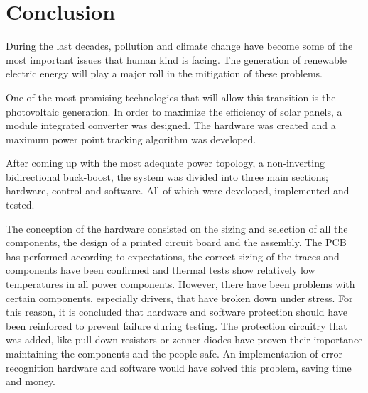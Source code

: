 \chapter{Conclusion}\label{ch:conclusion}






During the last decades, pollution and climate change have become some of the most important issues that human kind is facing. The generation of renewable electric energy will play a major roll in the mitigation of these problems.

One of the most promising technologies that will allow this transition is the photovoltaic generation. 
In order to maximize the efficiency of solar panels, a module integrated converter was designed.
The hardware was created and a maximum power point tracking algorithm was developed.

After coming up with the most adequate power topology, a non-inverting bidirectional buck-boost, the system was divided into three main sections; hardware, control and software. All of which were developed, implemented and tested.

The conception of the hardware consisted on the sizing and selection of all the components, the design of a printed circuit board and the assembly. 
The PCB has performed according to expectations, the correct sizing of the traces and components have  been confirmed and thermal tests show relatively low temperatures in all power components. 
However, there have been problems with certain components, especially drivers, that have broken down under stress. For this reason, it is concluded that hardware and software protection should have been reinforced to prevent failure during testing.
The protection circuitry that was added, like pull down resistors or zenner diodes have proven their importance maintaining the components and the people safe. An implementation of error recognition hardware and software would have solved this problem, saving time and money.

